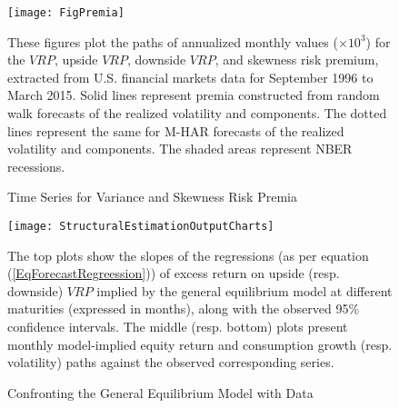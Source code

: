\documentclass[11pt]{article}
\begin{document}
\clearpage
\newpage



\begin{figure}
\begin{center}
    \caption{Time Series for Variance and Skewness Risk Premia}\label{FigDSVRP-SkewnessPremTS}
 \texttt{[image: FigPremia]}
  \end{center}

\noindent\scriptsize These figures plot the paths of annualized monthly values ($\times 10^3$) for the $VRP$, upside $VRP$, downside $VRP$, and skewness risk premium, extracted from U.S. financial markets data for September 1996 to March 2015. Solid lines represent premia constructed from random walk forecasts of the realized volatility and components. The dotted lines represent the same for M-HAR forecasts of the realized volatility and components. The shaded areas represent NBER recessions.


\end{figure}


\clearpage
\newpage


\begin{figure}
\begin{center}
    \caption{Confronting the General Equilibrium Model with Data}\label{FigGEResult}
  \texttt{[image: StructuralEstimationOutputCharts]}
\end{center}
\noindent\scriptsize The top plots show the slopes of the regressions (as per equation (\ref{EqForecastRegreession})) of excess return on upside (resp. downside) $VRP$ implied by the general equilibrium model at different maturities (expressed in months), along with the observed 95\% confidence intervals. The middle (resp. bottom) plots present monthly model-implied equity return and consumption growth (resp. volatility) paths against the observed corresponding series.
\end{figure}
\end{document}
